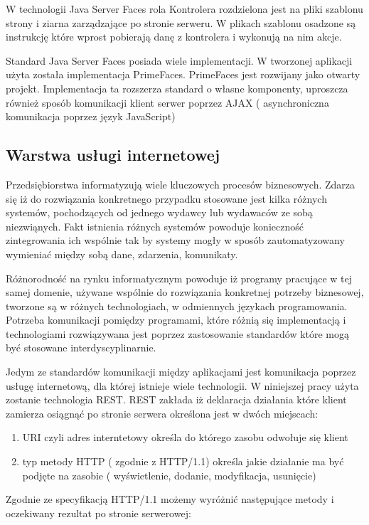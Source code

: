 W technologii Java Server Faces rola Kontrolera rozdzielona jest na pliki szablonu strony i ziarna zarządzające po stronie serweru. W plikach szablonu osadzone są instrukcję które wprost pobierają danę z kontrolera i wykonują na nim akcje.

Standard Java Server Faces posiada wiele implementacji. W tworzonej aplikacji użyta została implementacja PrimeFaces\cite{primeFaces}. PrimeFaces jest rozwijany jako otwarty projekt. Implementacja ta rozszerza standard o własne komponenty, uproszcza również sposób komunikacji klient serwer poprzez AJAX ( asynchroniczna komunikacja poprzez język JavaScript)

\subsection{Warstwa usługi internetowej}

Przedsiębiorstwa informatyzują wiele kluczowych procesów biznesowych. Zdarza się iż do rozwiązania konkretnego przypadku stosowane jest kilka różnych systemów, pochodzących od jednego wydawcy lub wydawaców ze sobą niezwiąnych. Fakt istnienia różnych systemów powoduje konieczność zintegrowania ich wspólnie tak by systemy mogły w sposób zautomatyzowany wymieniać między sobą dane, zdarzenia, komunikaty.

Różnorodność na rynku informatycznym powoduje iż programy pracujące w tej samej domenie, używane wspólnie do rozwiązania konkretnej potrzeby biznesowej, tworzone są w różnych technologiach, w odmiennych językach programowania. Potrzeba komunikacji pomiędzy programami, które różnią się implementacją i technologiami rozwiązywana jest poprzez zastosowanie standardów które mogą być stosowane interdyscyplinarnie.

Jedym ze standardów komunikacji między aplikacjami jest komunikacja poprzez usługę internetową, dla której istnieje wiele technologii. W niniejszej pracy użyta zostanie technologia REST. REST zakłada iż deklaracja działania które klient zamierza osiągnąć po stronie serwera określona jest w dwóch miejscach:
\begin{enumerate}
  \item URI czyli adres interntetowy określa do którego zasobu odwołuje się klient
  \item  typ metody HTTP ( zgodnie z HTTP/1.1) określa jakie działanie ma być podjęte na zasobie ( wyświetlenie, dodanie, modyfikacja, usunięcie)
\end{enumerate}

Zgodnie ze specyfikacją HTTP/1.1 możemy wyróżnić następujące metody i oczekiwany rezultat po stronie serwerowej:

